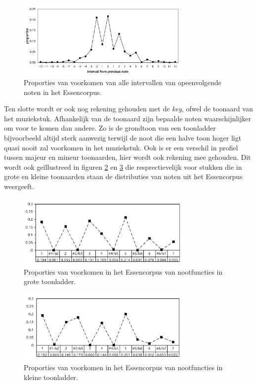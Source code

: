 \begin{figure}[!ht]
  \centering
  \includegraphics[width=0.75\textwidth]{2_Objectieve_Beoordeling/proximity}
  \caption{Proporties van voorkomen van alle intervallen van opeenvolgende noten in het Essencorpus.}
  \label{figuur:proximity}
\end{figure}

Ten slotte wordt er ook nog rekening gehouden met de \textit{key}, ofwel de toonaard van het muziekstuk. Afhankelijk van de toonaard zijn bepaalde noten waarschijnlijker om voor te komen dan andere. Zo is de grondtoon van een toonladder bijvoorbeeld altijd sterk aanwezig terwijl de noot die een halve toon hoger ligt quasi nooit zal voorkomen in het muziekstuk. Ook is er een verschil in profiel tussen majeur en mineur toonaarden, hier wordt ook rekening mee gehouden. Dit wordt ook ge\"illustreed in figuren \ref{figuur:key_major} en \ref{figuur:key_minor} die resprectievelijk voor stukken die in grote en kleine toonaarden staan de distributies van noten uit het Essencorpus weergeeft. 

\begin{figure}[!ht]
  \centering
  \includegraphics[width=0.75\textwidth]{2_Objectieve_Beoordeling/key_major}
  \caption{Proporties van voorkomen in het Essencorpus van nootfuncties in grote toonladder.}
  \label{figuur:key_major}
\end{figure}

\begin{figure}[!ht]
  \centering
  \includegraphics[width=0.75\textwidth]{2_Objectieve_Beoordeling/key_minor}
  \caption{Proporties van voorkomen in het Essencorpus van nootfuncties in kleine toonladder.}
  \label{figuur:key_minor}
\end{figure}

